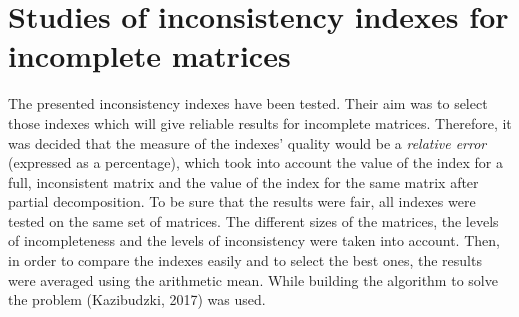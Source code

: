 \chapter{Studies of inconsistency indexes for incomplete matrices}
\label{sec:studiesOfInconsistencyIndexesForIncompleteMatrices}

The presented inconsistency indexes have been tested. Their aim was to select those indexes which will give reliable results for incomplete matrices. Therefore, it was decided that the measure of the indexes' quality would be a \textit{relative error} (expressed as a percentage), which took into account the value of the index for a full, inconsistent matrix and the value of the index for the same matrix after partial decomposition. To be sure that the results were fair, all indexes were tested on the same set of matrices. The different sizes of the matrices, the levels of incompleteness and the levels of inconsistency were taken into account. Then, in order to compare the indexes easily and to select the best ones, the results were averaged using the arithmetic mean. While building the algorithm to solve the problem (Kazibudzki, 2017) was used.

